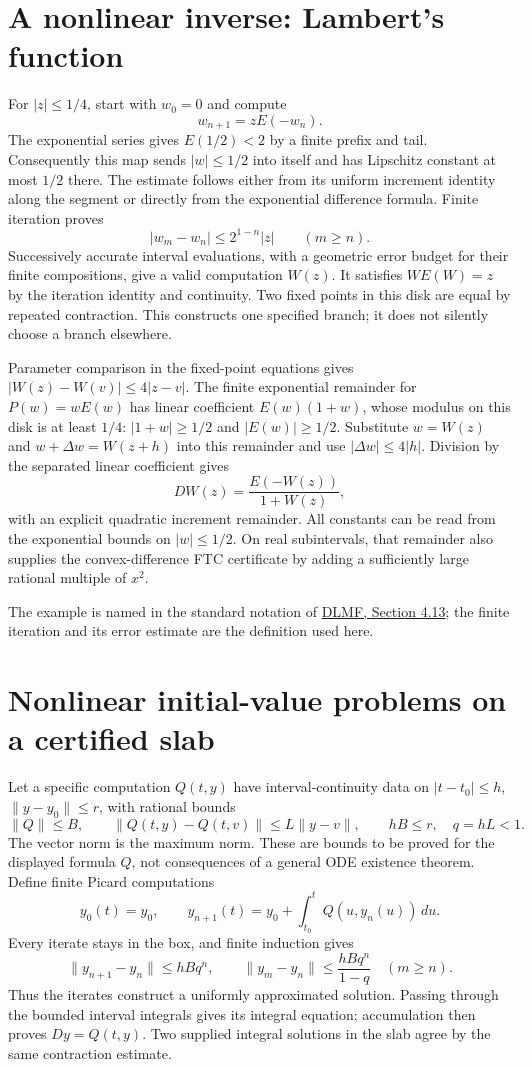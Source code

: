 \section{A nonlinear inverse: Lambert's function}
\label{sec:lambert-construction}
For $|z|\le1/4$, start with $w_0=0$ and compute
\[
 w_{n+1}=zE(-w_n).
\]
The exponential series gives $E(1/2)<2$ by a finite prefix and tail.
Consequently this map sends $|w|\le1/2$ into itself and has Lipschitz
constant at most $1/2$ there.  The estimate follows either from its
uniform increment identity along the segment or directly from the
exponential difference formula.  Finite iteration proves
\[
 |w_m-w_n|\le 2^{1-n}|z|\qquad(m\ge n).
\]
Successively accurate interval evaluations, with a geometric error budget
for their finite compositions, give a valid computation $W(z)$.  It
satisfies $W E(W)=z$ by the iteration identity and continuity.  Two fixed
points in this disk are equal by repeated contraction.  This constructs
one specified branch; it does not silently choose a branch elsewhere.

Parameter comparison in the fixed-point equations gives
$|W(z)-W(v)|\le4|z-v|$.  The finite exponential remainder for
$P(w)=wE(w)$ has linear coefficient $E(w)(1+w)$, whose modulus on this
disk is at least $1/4$: $|1+w|\ge1/2$ and $|E(w)|\ge1/2$.
Substitute $w=W(z)$ and $w+\Delta w=W(z+h)$ into this remainder and use
$|\Delta w|\le4|h|$.  Division by the separated linear coefficient gives
\[
 DW(z)=\frac{E(-W(z))}{1+W(z)},
\]
with an explicit quadratic increment remainder.  All constants can be
read from the exponential bounds on $|w|\le1/2$.  On real subintervals,
that remainder also supplies the convex-difference FTC certificate by
adding a sufficiently large rational multiple of $x^2$.

The example is named in the standard notation of
\href{https://dlmf.nist.gov/4.13}{DLMF, Section 4.13}; the finite iteration
and its error estimate are the definition used here.

\section{Nonlinear initial-value problems on a certified slab}
\label{sec:nonlinear-slab}
Let a specific computation $Q(t,y)$ have interval-continuity data on
$|t-t_0|\le h$, $\|y-y_0\|\le r$, with rational bounds
\[
 \|Q\|\le B,\qquad
 \|Q(t,y)-Q(t,v)\|\le L\|y-v\|,\qquad
 hB\le r,\quad q=hL<1.
\]
The vector norm is the maximum norm.  These are bounds to be proved for
the displayed formula $Q$, not consequences of a general ODE existence
theorem.  Define finite Picard computations
\[
 y_0(t)=y_0,\qquad
 y_{n+1}(t)=y_0+\int_{t_0}^t Q(u,y_n(u))\,du.
\]
Every iterate stays in the box, and finite induction gives
\[
 \|y_{n+1}-y_n\|\le hBq^n,\qquad
 \|y_m-y_n\|\le\frac{hBq^n}{1-q}\quad(m\ge n).
\]
Thus the iterates construct a uniformly approximated solution.  Passing
through the bounded interval integrals gives its integral equation;
accumulation then proves $Dy=Q(t,y)$.  Two supplied integral solutions
in the slab agree by the same contraction estimate.


